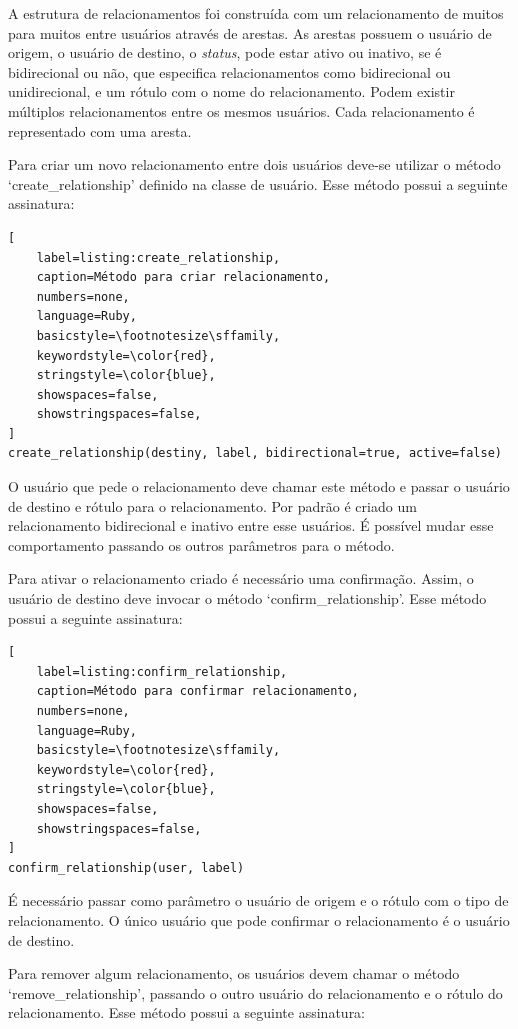 A estrutura de relacionamentos foi construída com um relacionamento de muitos para muitos entre usuários através de arestas. As arestas possuem o usuário de origem, o usuário de destino, o \textit{status}, pode estar ativo ou inativo, se é bidirecional ou não, que  especifica relacionamentos como bidirecional ou unidirecional, e um rótulo com o nome do relacionamento. Podem existir múltiplos relacionamentos entre os mesmos usuários. Cada relacionamento é representado com uma aresta.

Para criar um novo relacionamento entre dois usuários deve-se utilizar o método `create\_relationship' definido na classe de usuário. Esse método possui a seguinte assinatura:

\begin{lstlisting}[
    label=listing:create_relationship,
    caption=Método para criar relacionamento,
    numbers=none,
    language=Ruby,
    basicstyle=\footnotesize\sffamily,
    keywordstyle=\color{red},
    stringstyle=\color{blue},
    showspaces=false,
    showstringspaces=false,
]
create_relationship(destiny, label, bidirectional=true, active=false)
\end{lstlisting}

O usuário que pede o relacionamento deve chamar este método e passar o usuário de destino e rótulo para o relacionamento. Por padrão é criado um relacionamento bidirecional e inativo entre esse usuários. É possível mudar esse comportamento passando os outros parâmetros para o método.

Para ativar o relacionamento criado é necessário uma confirmação. Assim, o usuário de destino deve invocar o método `confirm\_relationship'. Esse método possui a seguinte assinatura:

\begin{lstlisting}[
    label=listing:confirm_relationship,
    caption=Método para confirmar relacionamento,
    numbers=none,
    language=Ruby,
    basicstyle=\footnotesize\sffamily,
    keywordstyle=\color{red},
    stringstyle=\color{blue},
    showspaces=false,
    showstringspaces=false,
]
confirm_relationship(user, label)
\end{lstlisting}

É necessário passar como parâmetro o usuário de origem e o rótulo com o tipo de relacionamento. O único usuário que pode confirmar o relacionamento é o usuário de destino.

Para remover algum relacionamento, os usuários devem chamar o método `remove\_relationship', passando o outro usuário do relacionamento e o rótulo do relacionamento. Esse método possui a seguinte assinatura:

